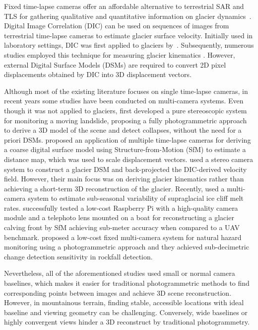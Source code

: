 Fixed time-lapse cameras offer an affordable alternative to terrestrial SAR and TLS for
gathering qualitative and quantitative information on glacier
dynamics~\citep{Giordan2016,James2016, Maas2006,Messerli2015}.
Digital Image Correlation (DIC) can be used on sequences of images from terrestrial
time-lapse cameras to estimate glacier surface velocity.
Initially used in laboratory settings, DIC was first applied to glaciers
by~\cite{Evans2000}. Subsequently, numerous studies employed this
technique for measuring glacier kinematics
\citep{ahn_box_2010,Giordan2016,Hadhri2019,James2016,Messerli2015}.
However, external Digital Surface Models (DSMs) are required to convert 2D pixel
displacements obtained by DIC into 3D displacement vectors.

Although most of the existing literature focuses on single time-lapse cameras, in recent
years some studies have been conducted on multi-camera systems.
Even though it was not applied to glaciers, \cite{roncella_landslide_2014} first
developed a pure stereoscopic system for monitoring a moving landslide, proposing a fully
photogrammetric approach to derive a 3D model of the scene and detect collapses, without
the need for a priori DSMs.
\cite{Schwalbe2017} proposed an application of multiple time-lapse cameras for deriving
a coarse digital surface model using Structure-from-Motion (SfM) to estimate a distance
map, which was used to scale displacement vectors.
\cite{Marsy2020} used a stereo camera system to construct a glacier DSM and
back-projected the DIC-derived velocity field.
However, their main focus was on deriving glacier kinematics rather than achieving a
short-term 3D reconstruction of the glacier.
Recently, \cite{kneib_sub-seasonal_2022} used a multi-camera system to
estimate sub-seasonal variability of supraglacial ice cliff melt rates.
\cite{Taylor2023} successfully tested a low-cost Raspberry Pi with a high-quality camera
module and a telephoto lens mounted on a boat for reconstructing a glacier calving front
by SfM achieving sub-meter accuracy when compared to a UAV benchmark.
\cite{Blanch2023} proposed a low-cost fixed multi-camera system for natural hazard
monitoring using a photogrammetric approach and they achieved sub-decimetric change
detection sensitivity in rockfall detection.

Nevertheless, all of the aforementioned studies used small or normal camera baselines,
which makes it easier for traditional photogrammetric methods to find corresponding
points between images and achieve 3D scene reconstruction.
However, in mountainous terrain, finding stable, accessible locations with ideal
baseline and viewing geometry can be challenging.
Conversely, wide baselines or highly convergent views hinder a 3D reconstruct by
traditional photogrammetry.

